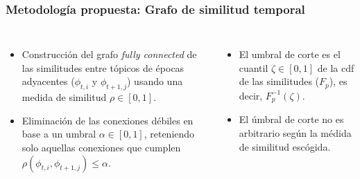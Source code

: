 \documentclass[
	spanish, %
	aspectratio=43, %
	hyperref={pdfencoding=auto,psdextra},
	xcolor={dvipsnames,table,usenames},
]{beamer}
\begin{document}
\begin{frame}[t]
\frametitle{Metodología propuesta: Grafo de similitud temporal}
\begin{columns}[t]
  \begin{itemize}
    \item Construcción del grafo \textit{fully connected} de las similitudes entre tópicos de épocas adyacentes ($\phi_{t,i}$ y $\phi_{t+1,j}$) usando una medida de similitud $\rho \in [0,1]$.
    \item Eliminación de las conexiones débiles en base a un umbral $\alpha \in [0,1]$, reteniendo solo aquellas conexiones que cumplen $\rho(\phi_{t,i}, \phi_{t+1,j})\leq \alpha$.
  \end{itemize}
		
  \begin{itemize}
    \item El umbral de corte es el cuantil $\zeta \in [0,1]$ de la cdf de las similitudes ($F_{p}$), es decir, $F_{p}^{-1}(\zeta)$.
    \item El úmbral de corte no es arbitrario según la médida de similitud escógida.
  \end{itemize}
\end{columns}
\end{frame}
\end{document}
